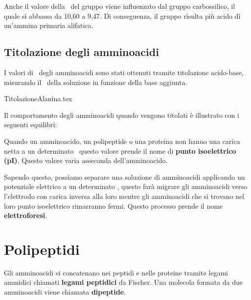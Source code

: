 Anche il valore della \pKa\ del gruppo  viene influenzato dal gruppo carbossilico, il quale si abbassa da 10,60 a 9,47. Di conseguenza, il gruppo  risulta più acido di un'ammina primaria alifatica.

\subsection{Titolazione degli amminoacidi}
I valori di \pKa\ degli amminoacidi sono stati ottenuti tramite titolazione acido-base, misurando il \pH\ della soluzione in funzione della base aggiunta.

{TitolazioneAlanina.tex}

Il comportamento degli amminoacidi quando vengono titolati è illustrato con i seguenti equilibri:
\begin{reaction}
	\arrow{<=>[\chemfig{H\charge{45:3pt=\chargeColor{-}}{O}}][\chemfig{\charge{30:3pt=\chargeColor{+}}{H}}]}
	\arrow{<=>[\chemfig{H\charge{45:3pt=\chargeColor{-}}{O}}][\chemfig{\charge{30:3pt=\chargeColor{+}}{H}}]}
\end{reaction}

Quando un amminoacido, un polipeptide o una proteina non hanno una carica netta a un determinato \pH\ questo valore prende il nome di \textbf{punto isoelettrico (pI)}. Questo valore varia asseconda dell'amminoacido.

Sapendo questo, possiamo separare una soluzione di amminoacidi applicando un potenziale elettrico a un determinato \pH, questo farà migrare gli amminoacidi verso l'elettrodo con carica inversa alla loro mentre gli amminoacidi che si trovano nel loro punto isoelettrico rimarranno fermi. Questo processo prende il nome \textbf{elettroforesi}.

\section{Polipeptidi}
Gli amminoacidi si concatenano nei peptidi e nelle proteine tramite legami ammidici chiamati \textbf{legami peptidici} da Fischer. Una molecola formata da due amminoacidi viene chiamata \textbf{dipeptide}.

